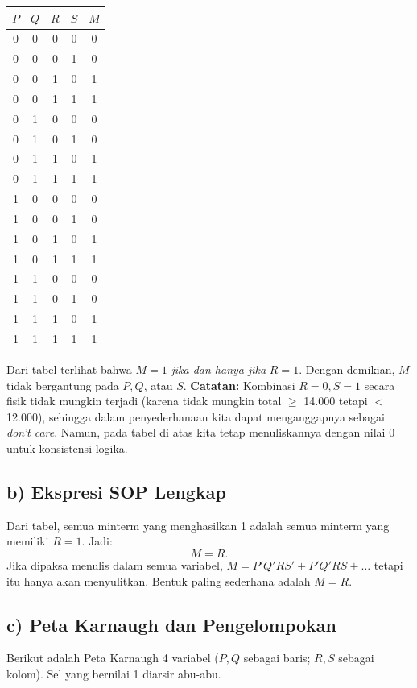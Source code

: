 \documentclass[12pt,a4paper]{article}
\begin{document}
\begin{center}
\begin{tabular}{|c|c|c|c||c|}
\hline
$P$ & $Q$ & $R$ & $S$ & $M$ \\
\hline
0 & 0 & 0 & 0 & 0 \\
0 & 0 & 0 & 1 & 0 \\
0 & 0 & 1 & 0 & 1 \\
0 & 0 & 1 & 1 & 1 \\
0 & 1 & 0 & 0 & 0 \\
0 & 1 & 0 & 1 & 0 \\
0 & 1 & 1 & 0 & 1 \\
0 & 1 & 1 & 1 & 1 \\
1 & 0 & 0 & 0 & 0 \\
1 & 0 & 0 & 1 & 0 \\
1 & 0 & 1 & 0 & 1 \\
1 & 0 & 1 & 1 & 1 \\
1 & 1 & 0 & 0 & 0 \\
1 & 1 & 0 & 1 & 0 \\
1 & 1 & 1 & 0 & 1 \\
1 & 1 & 1 & 1 & 1 \\
\hline
\end{tabular}
\end{center}

Dari tabel terlihat bahwa $M=1$ \emph{jika dan hanya jika} $R=1$. Dengan demikian, $M$ tidak bergantung pada $P, Q$, atau $S$.  
\textbf{Catatan:} Kombinasi $R=0, S=1$ secara fisik tidak mungkin terjadi (karena tidak mungkin total $\ge$ 14.000 tetapi $<$ 12.000), sehingga dalam penyederhanaan kita dapat menganggapnya sebagai \textit{don't care}. Namun, pada tabel di atas kita tetap menuliskannya dengan nilai 0 untuk konsistensi logika.

\subsection*{b) Ekspresi SOP Lengkap}
Dari tabel, semua minterm yang menghasilkan 1 adalah semua minterm yang memiliki $R=1$. Jadi:
\[
M = R.
\]
Jika dipaksa menulis dalam semua variabel, $M = P'Q'RS' + P'Q'RS + \dots$ tetapi itu hanya akan menyulitkan. Bentuk paling sederhana adalah $M=R$.

\subsection*{c) Peta Karnaugh dan Pengelompokan}
Berikut adalah Peta Karnaugh 4 variabel ($P, Q$ sebagai baris; $R, S$ sebagai kolom). Sel yang bernilai 1 diarsir abu-abu.
\end{document}
